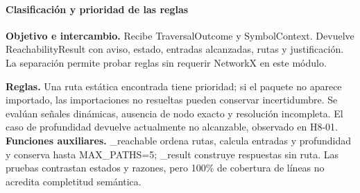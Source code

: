 \paragraph*{Clasificación y prioridad de las reglas}
\textbf{Objetivo e intercambio.} Recibe TraversalOutcome y SymbolContext. Devuelve ReachabilityResult con aviso, estado, entradas alcanzadas, rutas y justificación. La separación permite probar reglas sin requerir NetworkX en este módulo.
\par\begingroup{}
\noindent\begin{minipage}{\textwidth}

\end{minipage}
\endgroup
{}
\textbf{Reglas.} Una ruta estática encontrada tiene prioridad; si el paquete no aparece importado, las importaciones no resueltas pueden conservar incertidumbre. Se evalúan señales dinámicas, ausencia de nodo exacto y resolución incompleta. El caso de profundidad devuelve actualmente no alcanzable, observado en H8-01. \textbf{Funciones auxiliares.} \_reachable ordena rutas, calcula entradas y profundidad y conserva hasta MAX\_PATHS=5; \_result construye respuestas sin ruta. Las pruebas contrastan estados y razones, pero 100\% de cobertura de líneas no acredita completitud semántica.
